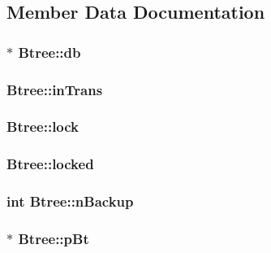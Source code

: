 \subsection{Member Data Documentation}
\hypertarget{struct_btree_a2b3cfec48b6e9fcfd641d433816ae5c3}{
\subsubsection[{db}]{$\ast$ Btree\-::db}}\label{struct_btree_a2b3cfec48b6e9fcfd641d433816ae5c3}
\hypertarget{struct_btree_a50007448960c05dfd1fdc7db3e277685}{
\subsubsection[{in\-Trans}]{ Btree\-::in\-Trans}}\label{struct_btree_a50007448960c05dfd1fdc7db3e277685}
\hypertarget{struct_btree_a943ed8799c9943f753a88cf44f1632dc}{
\subsubsection[{lock}]{ Btree\-::lock}}\label{struct_btree_a943ed8799c9943f753a88cf44f1632dc}
\hypertarget{struct_btree_a16fc8292bae9a66cfec03f6cb82d06a8}{
\subsubsection[{locked}]{ Btree\-::locked}}\label{struct_btree_a16fc8292bae9a66cfec03f6cb82d06a8}
\hypertarget{struct_btree_a7a3e7cf38bc9c3021a9e270a54ecfb1e}{
\subsubsection[{n\-Backup}]{\setlength{\rightskip}{0pt plus 5cm}int Btree\-::n\-Backup}}\label{struct_btree_a7a3e7cf38bc9c3021a9e270a54ecfb1e}
\hypertarget{struct_btree_a63bab5d744d48d14368af048dddf2f20}{
\subsubsection[{p\-Bt}]{$\ast$ Btree\-::p\-Bt}}\label{struct_btree_a63bab5d744d48d14368af048dddf2f20}
